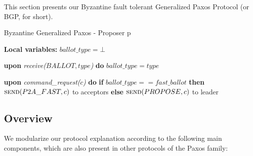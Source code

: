 
This section presents our Byzantine fault tolerant Generalized Paxos
Protocol (or BGP, for short). 

\begin{algorithm}
	\caption{Byzantine Generalized Paxos - Proposer p}
	\label{BFT-Prop}
	\textbf{Local variables:} $ballot\_type = \bot$
	\begin{algorithmic}[1]	
		
		\State \textbf{upon} \textit{receive($BALLOT, type$)} \textbf{do} 
		\State \hspace{\algorithmicindent} $ballot\_type = type$
		\State
		
		\State \textbf{upon} \textit{command\_request($c$)} \textbf{do}   \hspace{\algorithmicindent}\hspace{\algorithmicindent}\hspace{\algorithmicindent}\hspace{\algorithmicindent}
		\State \hspace{\algorithmicindent} \textbf{if} $ballot\_type == fast\_ballot$ \textbf{then}
		\State \hspace{\algorithmicindent}\hspace{\algorithmicindent} $\Call{send}{P2A\_FAST, c}$ to acceptors
		\State \hspace{\algorithmicindent} \textbf{else} 
		\State \hspace{\algorithmicindent}\hspace{\algorithmicindent} $\Call{send}{PROPOSE, c}$ to leader
	\end{algorithmic}
\end{algorithm}

\subsection{Overview}
We modularize our protocol explanation according to the following main components, which are also present in other protocols of the Paxos family:

